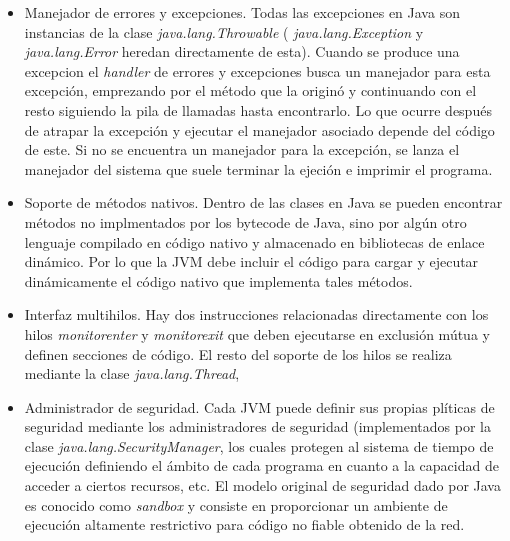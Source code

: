\documentclass[english,runningheads,a4paper]{llncs}[2018/03/10]
\begin{document}
\begin{itemize}
    \item Manejador de errores y excepciones. Todas las excepciones en Java son instancias de la clase \textit{java.lang.Throwable} ( \textit{java.lang.Exception} y \textit{java.lang.Error} heredan directamente de esta). Cuando se produce una excepcion el \textit{handler} de errores y excepciones busca un manejador para esta excepción, emprezando por el método que la originó y continuando con el resto siguiendo la pila de llamadas hasta encontrarlo. Lo que ocurre después de atrapar la excepción y ejecutar el manejador asociado depende del código de este. Si no se encuentra un manejador para la excepción, se lanza el manejador del sistema que suele terminar la ejeción e imprimir el programa.
    \item Soporte de métodos nativos. Dentro de las clases en Java se pueden encontrar métodos no implmentados por los bytecode de Java, sino por algún otro lenguaje compilado en código nativo y almacenado en bibliotecas de enlace dinámico. Por lo que la JVM debe incluir el código para cargar y ejecutar dinámicamente el código nativo que implementa tales métodos.
    \item Interfaz multihilos. Hay dos instrucciones relacionadas directamente con los hilos \textit{monitorenter} y \textit{monitorexit} que deben ejecutarse en exclusión mútua y definen secciones de código. El resto del soporte de los hilos se realiza mediante la clase \textit{java.lang.Thread},
    \item Administrador de seguridad. Cada JVM puede definir sus propias plíticas de seguridad mediante los administradores de seguridad (implementados por la clase \textit{java.lang.SecurityManager}, los cuales protegen al sistema de tiempo de ejecución definiendo el ámbito de cada programa en cuanto a la capacidad de acceder a ciertos recursos, etc. El modelo original de seguridad dado por Java es conocido como \textit{sandbox} y consiste en proporcionar un ambiente de ejecución altamente restrictivo para código no fiable obtenido de la red. 
\end{itemize}
\end{document}
